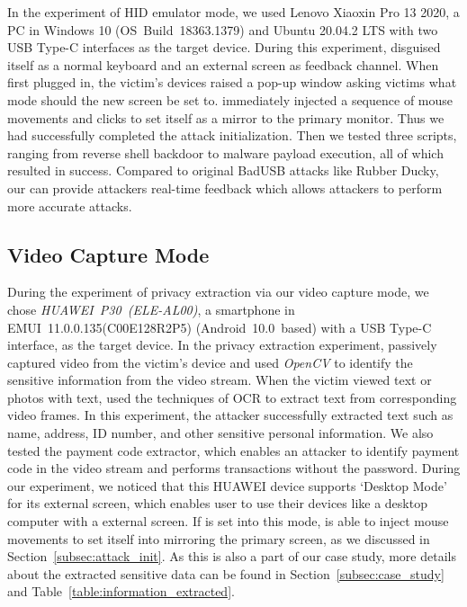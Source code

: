 In the experiment of HID emulator mode, we used {Lenovo Xiaoxin Pro 13
2020}, a PC in Windows 10 \mbox{(OS Build 18363.1379)} and Ubuntu 20.04.2 LTS with two \ac{USB} Type-C interfaces as the
target device. During this experiment, \tool disguised itself as a normal keyboard and an external screen as feedback channel. When first plugged in, the victim's devices raised a pop-up window asking victims what mode should the new screen be set to. \tool immediately injected a sequence of mouse movements and clicks to set itself as a mirror to the primary monitor. Thus we had successfully completed the attack initialization. Then we tested three scripts, ranging from reverse shell backdoor to malware payload execution, all of which resulted in success. Compared to original BadUSB attacks like Rubber Ducky, our \tool can provide attackers real-time feedback which allows attackers to perform more accurate attacks.


\subsection{Video Capture Mode}

During the experiment of privacy extraction via our video capture mode, we chose \mbox{\textit{HUAWEI P30 (ELE-AL00)}}, a
smartphone in \mbox{EMUI 11.0.0.135(C00E128R2P5)} \mbox{(Android 10.0 based)} with a \ac{USB} Type-C interface, as the
target device. In the privacy extraction experiment, \tool passively captured video
from the victim's device and used \textit{OpenCV} to identify the sensitive
information from the video stream.  When the victim viewed text or photos with
text, \tool used the techniques of \ac{OCR}  to
extract text from corresponding video frames. In this experiment, the attacker
successfully extracted text such as name, address, ID number, and other sensitive
personal information. We also tested the payment code extractor, which enables
an attacker to identify payment code in the video stream and performs transactions
without the password. During our experiment, we noticed that this HUAWEI device supports `Desktop Mode'
for its external screen, which enables user to use their devices like a desktop computer with a external screen.
If \tool is set into this mode, \tool is able to inject mouse movements to set itself into mirroring the primary screen, as we discussed in Section~\ref{subsec:attack_init}.
As this is also a part of our case study, more details about
the extracted sensitive data can be found in Section~\ref{subsec:case_study} and
Table~\ref{table:information_extracted}.

